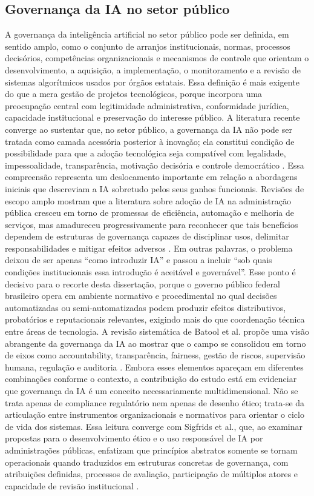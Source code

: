 \documentclass[12pt,a4paper]{article}
\begin{document}
\subsection{Governança da IA no setor público}
\label{sec:org3ec3239}
A governança da inteligência artificial no setor público pode ser definida, em sentido amplo, como o conjunto de arranjos institucionais, normas, processos decisórios, competências organizacionais e mecanismos de controle que orientam o desenvolvimento, a aquisição, a implementação, o monitoramento e a revisão de sistemas algorítmicos usados por órgãos estatais. Essa definição é mais exigente do que a mera gestão de projetos tecnológicos, porque incorpora uma preocupação central com legitimidade administrativa, conformidade jurídica, capacidade institucional e preservação do interesse público. A literatura recente converge ao sustentar que, no setor público, a governança da IA não pode ser tratada como camada acessória posterior à inovação; ela constitui condição de possibilidade para que a adoção tecnológica seja compatível com legalidade, impessoalidade, transparência, motivação decisória e controle democrático \autocite{sigfrids2022how} \autocite{batool2025ai} \autocite{serra2024a}.
Essa compreensão representa um deslocamento importante em relação a abordagens iniciais que descreviam a IA sobretudo pelos seus ganhos funcionais. Revisões de escopo amplo mostram que a literatura sobre adoção de IA na administração pública cresceu em torno de promessas de eficiência, automação e melhoria de serviços, mas amadureceu progressivamente para reconhecer que tais benefícios dependem de estruturas de governança capazes de disciplinar usos, delimitar responsabilidades e mitigar efeitos adversos \autocite{madan2022ai} \autocite{alhosani2024opportunities}. Em outras palavras, o problema deixou de ser apenas “como introduzir IA” e passou a incluir “sob quais condições institucionais essa introdução é aceitável e governável”. Esse ponto é decisivo para o recorte desta dissertação, porque o governo público federal brasileiro opera em ambiente normativo e procedimental no qual decisões automatizadas ou semi-automatizadas podem produzir efeitos distributivos, probatórios e reputacionais relevantes, exigindo mais do que coordenação técnica entre áreas de tecnologia.
A revisão sistemática de Batool et al. propõe uma visão abrangente da governança da IA ao mostrar que o campo se consolidou em torno de eixos como accountability, transparência, fairness, gestão de riscos, supervisão humana, regulação e auditoria \autocite{batool2025ai}. Embora esses elementos apareçam em diferentes combinações conforme o contexto, a contribuição do estudo está em evidenciar que governança da IA é um conceito necessariamente multidimensional. Não se trata apenas de compliance regulatório nem apenas de desenho ético; trata-se da articulação entre instrumentos organizacionais e normativos para orientar o ciclo de vida dos sistemas. Essa leitura converge com Sigfrids et al., que, ao examinar propostas para o desenvolvimento ético e o uso responsável de IA por administrações públicas, enfatizam que princípios abstratos somente se tornam operacionais quando traduzidos em estruturas concretas de governança, com atribuições definidas, processos de avaliação, participação de múltiplos atores e capacidade de revisão institucional \autocite{sigfrids2022how}.
\end{document}

